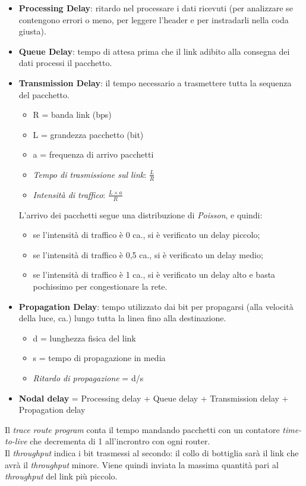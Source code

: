 \begin{itemize}
	\item \textbf{Processing Delay}: ritardo nel processare i dati ricevuti (per analizzare se contengono errori o meno, per leggere l'header e per instradarli nella coda giusta).
	\item \textbf{Queue Delay}: tempo di attesa prima che il link adibito alla consegna dei dati processi il pacchetto.
	\item \textbf{Transmission Delay}: il tempo necessario a trasmettere tutta la sequenza del pacchetto.
	\begin{itemize}
		\item R = banda link (bps)
		\item L = grandezza pacchetto (bit)
		\item a = frequenza di arrivo pacchetti
		\item \textit{Tempo di trasmissione sul link}: $\frac{L}{R}$
		\item \textit{Intensità di traffico}: $\frac{L\times a}{R}$
	\end{itemize}
	L'arrivo dei pacchetti segue una distribuzione di \textit{Poisson}, e quindi:
	\begin{itemize}
	    \item se l'intensità di traffico è 0 ca., si è verificato un delay piccolo;
	    \item se l'intensità di traffico è 0,5 ca., si è verificato un delay medio;
	    \item se l'intensità di traffico è 1 ca., si è verificato un delay alto e basta pochissimo per congestionare la rete.
	\end{itemize}
	\item \textbf{Propagation Delay}: tempo utilizzato dai bit per propagarsi (alla velocità della luce, ca.) lungo tutta la linea fino alla destinazione.
	\begin{itemize}
		\item d = lunghezza fisica del link
		\item s = tempo di propagazione in media
		\item \textit{Ritardo di propagazione} = d/s
	\end{itemize}
	\item \textbf{Nodal delay} = Processing delay + Queue delay + Transmission delay + Propagation delay
\end{itemize}

Il \textit{trace route program} conta il tempo mandando pacchetti con un contatore \textit{time-to-live} che decrementa di 1 all'incrontro con ogni router.
\\
Il \textit{throughput} indica i bit trasmessi al secondo: il collo di bottiglia sarà il link che avrà il \textit{throughput} minore. Viene quindi inviata la massima quantità pari al \textit{throughput} del link più piccolo.